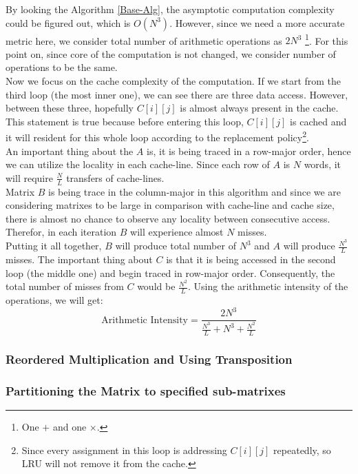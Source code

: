 \documentclass[paper=a4, fontsize=11pt]{scrartcl} %
\numberwithin{equation}{section} %
\numberwithin{figure}{section} %
\numberwithin{table}{section} %
\begin{document}
By looking the Algorithm \ref{Base-Alg}, the asymptotic computation complexity could be figured out, which is $O(N^{3})$. However, since we need a more accurate metric here, we consider total number of arithmetic operations as $2N^{3}$  \footnote{ One $+$ and one $\times$.}. For this point on, since core of the computation is not changed, we consider number of operations to be the same.\\
Now we focus on the cache complexity of the computation. If we start from the third loop (the most inner one), we can see there are three data access. However, between these three, hopefully $C[ i ][ j ]$ is almost always present in the cache. This statement is true because before entering this loop, $C[ i ][ j ]$ is cached and it will resident for this whole loop according to the replacement policy\footnote{Since every assignment in this loop is addressing $C[ i ][ j ]$ repeatedly, so LRU will not remove it from the cache.}.\\
An important thing about the $A$ is, it is being traced in a row-major order, hence we can utilize the locality in each cache-line. Since each row of $A$ is $N$ words, it will require $\frac{N}{L}$ transfers of cache-lines.\\
Matrix $B$ is being trace in the column-major in this algorithm and since we are considering matrixes to be large in comparison with cache-line and cache size, there is almost no chance to observe any locality between consecutive access. Therefor, in each iteration $B$ will experience almost $N$ misses.\\
Putting it all together, $B$ will produce total number of $N^{3}$ and $A$ will produce $\frac{N^{3}}{L}$ misses. The important thing about $C$ is that it is being accessed in the second loop (the middle one) and begin traced in row-major order. Consequently, the total number of misses from $C$ would be $\frac{N^{2}}{L}$. Using the arithmetic intensity of the operations, we will get:
\begin{equation*}
\text{Arithmetic Intensity} = \frac{2N^{3}}{ \frac{N^{3}}{L} + {N^{3}} + \frac{N^{2}}{L} }
\end{equation*}

\subsubsection{Reordered Multiplication and Using Transposition}
\subsubsection{Partitioning the Matrix to specified sub-matrixes}
\end{document}
